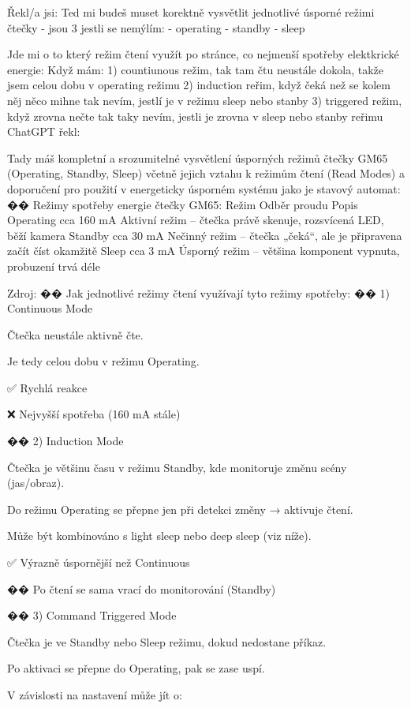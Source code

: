 Řekl/a jsi:
Ted mi budeš muset korektně vysvětlit jednotlivé úsporné režimi čtečky - jsou 3 jestli se nemýlím:
- operating
- standby
- sleep

Jde mi o to který režim čtení využít po stránce, co nejmenší spotřeby elektkrické energie:
Když mám: 
1) countiunous režim, tak tam čtu neustále dokola, takže jsem celou dobu v operating režimu
2) induction reřim, když čeká než se kolem něj něco mihne tak nevím, jestlí je v režimu sleep nebo stanby
3) triggered režim, když zrovna nečte tak taky nevím, jestli je zrovna v sleep nebo stanby reřimu
ChatGPT řekl:

Tady máš kompletní a srozumitelné vysvětlení úsporných režimů čtečky GM65 (Operating, Standby, Sleep) včetně jejich vztahu k režimům čtení (Read Modes) a doporučení pro použití v energeticky úsporném systému jako je stavový automat:
�� Režimy spotřeby energie čtečky GM65:
Režim	Odběr proudu	Popis
Operating	cca 160 mA	Aktivní režim – čtečka právě skenuje, rozsvícená LED, běží kamera
Standby	cca 30 mA	Nečinný režim – čtečka „čeká“, ale je připravena začít číst okamžitě
Sleep	cca 3 mA	Úsporný režim – většina komponent vypnuta, probuzení trvá déle

Zdroj:
�� Jak jednotlivé režimy čtení využívají tyto režimy spotřeby:
�� 1) Continuous Mode

    Čtečka neustále aktivně čte.

    Je tedy celou dobu v režimu Operating.

    ✅ Rychlá reakce

    ❌ Nejvyšší spotřeba (160 mA stále)

��️ 2) Induction Mode

    Čtečka je většinu času v režimu Standby, kde monitoruje změnu scény (jas/obraz).

    Do režimu Operating se přepne jen při detekci změny → aktivuje čtení.

    Může být kombinováno s light sleep nebo deep sleep (viz níže).

    ✅ Výrazně úspornější než Continuous

    �� Po čtení se sama vrací do monitorování (Standby)

��️ 3) Command Triggered Mode

    Čtečka je ve Standby nebo Sleep režimu, dokud nedostane příkaz.

    Po aktivaci se přepne do Operating, pak se zase uspí.

    V závislosti na nastavení může jít o:

